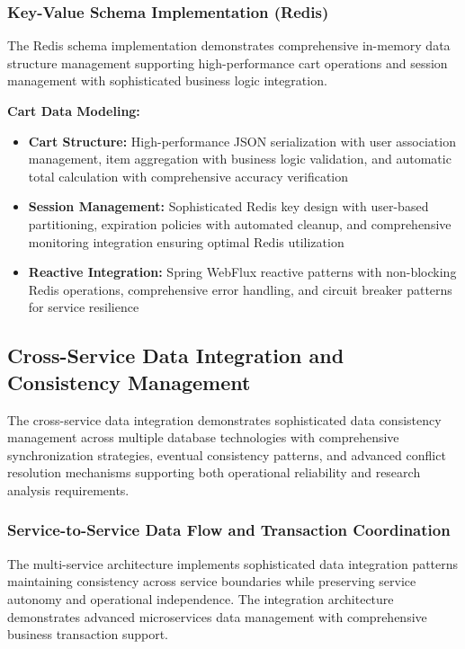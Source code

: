 \subsubsection{Key-Value Schema Implementation (Redis)}

The Redis schema implementation demonstrates comprehensive in-memory data structure management supporting high-performance cart operations and session management with sophisticated business logic integration.

\textbf{Cart Data Modeling:}
\begin{itemize}
\item \textbf{Cart Structure:} High-performance JSON serialization with user association management, item aggregation with business logic validation, and automatic total calculation with comprehensive accuracy verification
\item \textbf{Session Management:} Sophisticated Redis key design with user-based partitioning, expiration policies with automated cleanup, and comprehensive monitoring integration ensuring optimal Redis utilization
\item \textbf{Reactive Integration:} Spring WebFlux reactive patterns with non-blocking Redis operations, comprehensive error handling, and circuit breaker patterns for service resilience
\end{itemize}

\subsection{Cross-Service Data Integration and Consistency Management}

The cross-service data integration demonstrates sophisticated data consistency management across multiple database technologies with comprehensive synchronization strategies, eventual consistency patterns, and advanced conflict resolution mechanisms supporting both operational reliability and research analysis requirements.

\subsubsection{Service-to-Service Data Flow and Transaction Coordination}

The multi-service architecture implements sophisticated data integration patterns maintaining consistency across service boundaries while preserving service autonomy and operational independence. The integration architecture demonstrates advanced microservices data management with comprehensive business transaction support.

